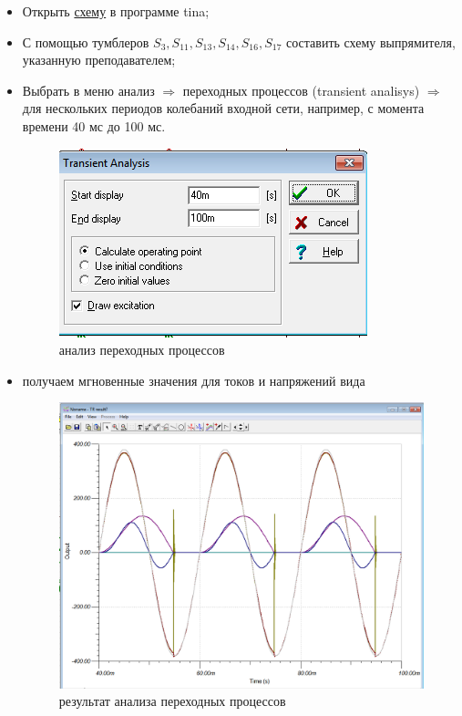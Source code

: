 \begin{itemize}
	\item Открыть \href{https://github.com/trot-t/power_electronics_virtual_labs/blob/master/power_electronic_L2.TSC}{схему} в программе tina;
\item С помощью тумблеров $S_3,S_{11},S_{13},S_{14},S_{16}, S_{17}$ составить схему выпрямителя, указанную преподавателем;
\item Выбрать в меню анализ $\Rightarrow$ переходных процессов (transient analisys) $\Rightarrow$ для нескольких периодов колебаний 
	входной сети, 
	например, с момента времени 40 мс до 100 мс.
\begin{figure}[!ht]
\centering
\includegraphics[scale=0.4]{analisys}
\caption{анализ переходных процессов}
\label{analisys}
\end{figure}	

\item получаем мгновенные значения для токов и напряжений вида 
\begin{figure}[!ht]
\centering
\includegraphics[scale=0.3]{result}
\caption{результат анализа переходных процессов}
\label{result}
\end{figure}	


\end{itemize}
